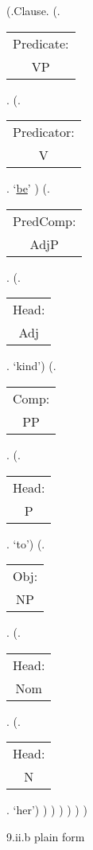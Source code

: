 \documentclass[12pt,letterpaper]{article}
\begin{document}
\begin{figure}
	\begin{center}
		\begin{parsetree}
			(.Clause.
			(.\begin{tabular}{c}Predicate:\\VP\end{tabular}.
			(.\begin{tabular}{c}Predicator:\\V\end{tabular}. `\underline{be}' )
			(.\begin{tabular}{c}PredComp:\\AdjP\end{tabular}.
			(.\begin{tabular}{c}Head:\\Adj\end{tabular}. `kind')
			(.\begin{tabular}{c}Comp:\\PP\end{tabular}.
			(.\begin{tabular}{c}Head:\\P\end{tabular}. `to')
			(.\begin{tabular}{c}Obj:\\NP\end{tabular}. 
			(.\begin{tabular}{c}Head:\\Nom\end{tabular}. 
			(.\begin{tabular}{c}Head:\\N\end{tabular}. `her')
			)
			)
			)
			)
			)
			)
			
			
		\end{parsetree}
		\hfill \break \hfill \break
		9.ii.b plain form
	\end{center}
\end{figure}
\end{document}
